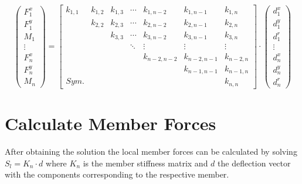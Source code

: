\begin{equation} \label{systemeq}
    \begin{pmatrix}
        F_{1}^x \\
        F_{1}^y \\
        M_{1} \\
        \vdots \\
        F_{n}^x \\
        F_{n}^y \\
        M_{n}
    \end{pmatrix} = \begin{bmatrix}
        k_{1,1}  & k_{1,2} & k_{1,3}  & \cdots & k_{1,n-2}   & k_{1,n-1}   & k_{1,n}   \\
                 & k_{2,2} & k_{2,3}  & \cdots & k_{2,n-2}   & k_{2,n-1}   & k_{2,n}   \\
                 &         & k_{3,3}  & \cdots & k_{3,n-2}   & k_{3,n-1}   & k_{3,n}   \\
                 &         &          & \ddots & \vdots      & \vdots      & \vdots    \\
                 &         &          &        & k_{n-2,n-2} & k_{n-2,n-1} & k_{n-2,n} \\
                 &         &          &        &             & k_{n-1,n-1} & k_{n-1,n} \\
        Sym.     &         &          &        &             &             & k_{n,n}   
    \end{bmatrix} \cdot \begin{pmatrix}
        d_{1}^x \\
        d_{1}^y \\
        d_{1}^r \\
        \vdots \\
        d_n^x \\
        d_n^y \\
        d_n^r
    \end{pmatrix}
\end{equation}

\section{Calculate Member Forces}
\label{sec:calcmemberforces}

After obtaining the solution the local member forces can be calculated by solving $S_l = K_n \cdot d$ where $K_n$ is the member stiffness matrix and $d$ the deflection vector with the components corresponding to the respective member.

